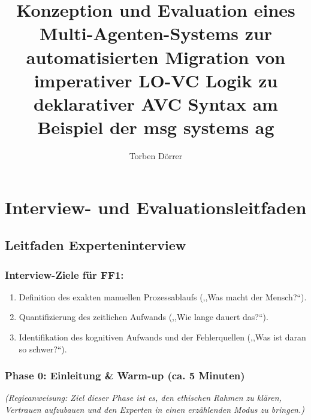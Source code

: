 \documentclass[12pt, a4paper, oneside]{book}
\begin{document}
\frontmatter
\begin{titlepage}
    \title{Konzeption und Evaluation eines Multi-Agenten-Systems zur automatisierten Migration von imperativer LO-VC Logik zu deklarativer AVC Syntax am Beispiel der msg systems ag }
    \author{Torben Dörrer}
\end{titlepage}
\maketitle
\tableofcontents
\newpage
 
\newpage

\mainmatter











\printbibliography[heading=bibintoc, title={Literaturverzeichnis}]

\appendix
\chapter{Interview- und Evaluationsleitfaden}
\section{Leitfaden Experteninterview}
\label{leitfaden_experteninterview}
\subsection*{Interview-Ziele für FF1:}
\begin{enumerate}
    \item Definition des exakten manuellen Prozessablaufs (,,Was macht der Mensch?``).
    \item Quantifizierung des zeitlichen Aufwands (,,Wie lange dauert das?``).
    \item Identifikation des kognitiven Aufwands und der Fehlerquellen (,,Was ist daran so schwer?``).
\end{enumerate}

\subsection*{Phase 0: Einleitung \& Warm-up (ca. 5 Minuten)}
\textit{(Regieanweisung: Ziel dieser Phase ist es, den ethischen Rahmen zu klären, Vertrauen aufzubauen und den Experten in einen erzählenden Modus zu bringen.)}
\end{document}
